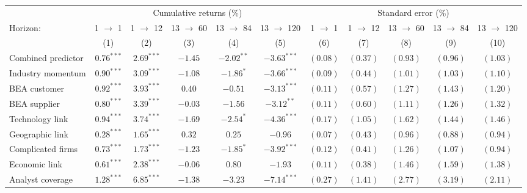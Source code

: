 \begin{tabular}{lcccccccccc}
   \toprule & \multicolumn{5}{c}{Cumulative returns (\%)} & \multicolumn{5}{c}{Standard error (\%)} \\
 \cmidrule(l){2-6} \cmidrule(l){7-11}Horizon: & 1 $\rightarrow$ 1 & 1 $\rightarrow$ 12 & 13 $\rightarrow$ 60 & 13 $\rightarrow$ 84 & 13 $\rightarrow$ 120 & 1 $\rightarrow$ 1 & 1 $\rightarrow$ 12 & 13 $\rightarrow$ 60 & 13 $\rightarrow$ 84 & 13 $\rightarrow$ 120 \\ 
   \cmidrule(l){2-6} \cmidrule(l){7-11} \vspace{5pt} & (1) & (2) & (3) & (4) & (5) & (6) & (7) & (8) & (9) & (10) \\ 
   \vspace{5pt}Combined predictor & $0.76^{***}$ & $2.69^{***}$ & $-1.45$ & $-2.02^{**}$ & $-3.63^{***}$ & $(0.08)$ & $(0.37)$ & $(0.93)$ & $(0.96)$ & $(1.03)$ \\ 
  Industry momentum & $0.90^{***}$ & $3.09^{***}$ & $-1.08$ & $-1.86^{*}$ & $-3.66^{***}$ & $(0.09)$ & $(0.44)$ & $(1.01)$ & $(1.03)$ & $(1.10)$ \\ 
  BEA customer & $0.92^{***}$ & $3.93^{***}$ & $0.40$ & $-0.51$ & $-3.13^{***}$ & $(0.11)$ & $(0.57)$ & $(1.27)$ & $(1.43)$ & $(1.20)$ \\ 
  BEA supplier & $0.80^{***}$ & $3.39^{***}$ & $-0.03$ & $-1.56$ & $-3.12^{**}$ & $(0.11)$ & $(0.60)$ & $(1.11)$ & $(1.26)$ & $(1.32)$ \\ 
  Technology link & $0.94^{***}$ & $3.74^{***}$ & $-1.69$ & $-2.54^{*}$ & $-4.36^{***}$ & $(0.17)$ & $(1.05)$ & $(1.62)$ & $(1.44)$ & $(1.46)$ \\ 
  Geographic link & $0.28^{***}$ & $1.65^{***}$ & $0.32$ & $0.25$ & $-0.96$ & $(0.07)$ & $(0.43)$ & $(0.96)$ & $(0.88)$ & $(0.94)$ \\ 
  Complicated firms & $0.73^{***}$ & $1.73^{***}$ & $-1.23$ & $-1.85^{*}$ & $-3.92^{***}$ & $(0.12)$ & $(0.41)$ & $(1.26)$ & $(1.07)$ & $(0.94)$ \\ 
  Economic link & $0.61^{***}$ & $2.38^{***}$ & $-0.06$ & $0.80$ & $-1.93$ & $(0.11)$ & $(0.38)$ & $(1.46)$ & $(1.59)$ & $(1.38)$ \\ 
  Analyst coverage & $1.28^{***}$ & $6.85^{***}$ & $-1.38$ & $-3.23$ & $-7.14^{***}$ & $(0.27)$ & $(1.41)$ & $(2.77)$ & $(3.19)$ & $(2.11)$ \\ 
   \bottomrule 
\end{tabular}
